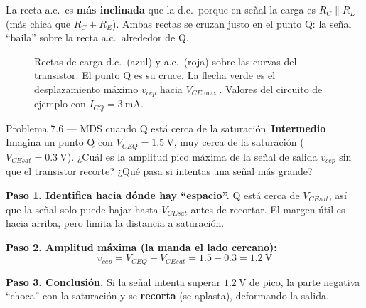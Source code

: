 \documentclass[11pt,a4paper]{article}
\newcommand{\intermedio}{\textcolor{naranjaVivo}{\faIcon{circle}\,\textbf{Intermedio}}}
\begin{document}
\begin{porqueBox}
La recta a.c.\ es \textbf{más inclinada} que la d.c.\ porque en señal la carga es $R_C\parallel R_L$ (más chica que $R_C+R_E$). Ambas rectas se cruzan justo en el punto Q: la señal ``baila'' sobre la recta a.c.\ alrededor de Q.
\end{porqueBox}

\begin{figure}[h]
\centering
{}
\caption{Rectas de carga d.c.\ (azul) y a.c.\ (roja) sobre las curvas del transistor. El punto Q es su cruce. La flecha verde es el desplazamiento máximo $v_{cep}$ hacia $V_{CE\max}$. Valores del circuito de ejemplo con $I_{CQ}=3\ \text{mA}$.}
\label{fig:rectascarga}
\end{figure}

\begin{problemaBox}{Problema 7.6 --- MDS cuando Q está cerca de la saturación \quad \intermedio}
Imagina un punto Q con $V_{CEQ}=1.5\ \text{V}$, muy cerca de la saturación ($V_{CEsat}=0.3\ \text{V}$). ¿Cuál es la amplitud pico máxima de la señal de salida $v_{cep}$ sin que el transistor recorte? ¿Qué pasa si intentas una señal más grande?
\end{problemaBox}

\begin{solucionBox}
\textbf{Paso 1. Identifica hacia dónde hay ``espacio''.} Q está cerca de $V_{CEsat}$, así que la señal solo puede bajar hasta $V_{CEsat}$ antes de recortar. El margen útil es hacia arriba, pero limita la distancia a saturación.

\textbf{Paso 2. Amplitud máxima (la manda el lado cercano):}
\[
v_{cep}=V_{CEQ}-V_{CEsat}=1.5-0.3=1.2\ \text{V}
\]

\textbf{Paso 3. Conclusión.} Si la señal intenta superar $1.2\ \text{V}$ de pico, la parte negativa ``choca'' con la saturación y se \textbf{recorta} (se aplasta), deformando la salida.
\end{solucionBox}
\end{document}
